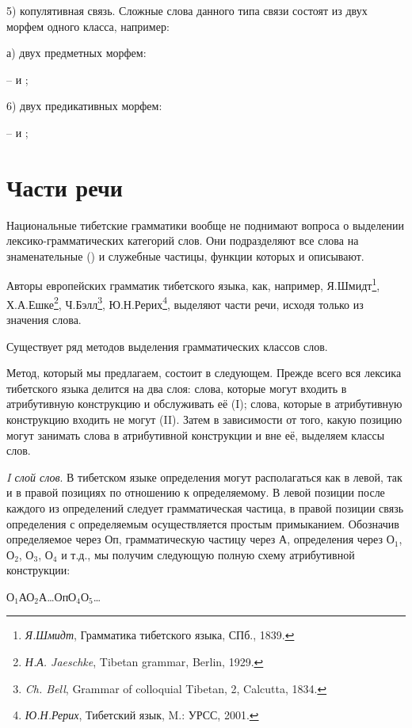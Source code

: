 5) копулятивная связь. Сложные слова данного типа связи состоят из двух морфем одного класса, например:

а) двух предметных морфем:
\begin{prfsample}
    \item {} --  и ; 
\end{prfsample}

6) двух предикативных морфем:
\begin{prfsample}
    \item {} --  и ;
\end{prfsample}

\section{Части речи}

Национальные тибетские грамматики вообще не поднимают вопроса о выделении лексико-грамматических категорий слов. Они подразделяют все слова на знаменательные () и служебные частицы, функции которых и описывают.

Авторы европейских грамматик тибетского языка, как, например,
Я.Шмидт\footnote[20]{\emph{Я.Шмидт}, Грамматика тибетского языка, СПб., 1839.},
Х.А.Ешке\footnote[21]{\emph{Н.А. Jaeschke}, Tibetan grammar, Berlin, 1929.},
Ч.Бэлл\footnote[22]{\emph{Ch. Bell}, Grammar of colloquial Tibetan, 2, Calcutta, 1834.},
Ю.Н.Рерих\footnote[23]{\emph{Ю.Н.Рерих}, Тибетский язык, M.: УРСС, 2001.},
выделяют части речи, исходя только из значения слова.

Существует ряд методов выделения грамматических классов слов.

Метод, который мы предлагаем, состоит в следующем. Прежде всего вся лексика тибетского языка делится на два слоя: слова, которые могут входить в атрибутивную конструкцию и обслуживать её (I); слова, которые в атрибутивную конструкцию входить не могут (II). Затем в зависимости от того, какую позицию могут занимать слова в атрибутивной конструкции и вне её, выделяем классы слов.

\emph{I слой слов}. В тибетском языке определения могут располагаться как в левой, так и в правой позициях по отношению к определяемому. В левой позиции после каждого из определений следует грамматическая частица, в правой позиции связь определения с определяемым осуществляется простым примыканием. Обозначив определяемое через Оп, грамматическую частицу через А, определения через О$_{1}$, О$_{2}$, О$_{3}$, О$_{4}$ и т.д., мы получим следующую полную схему атрибутивной конструкции:
\begin{center}
    О$_{1}$АО$_{2}$А\dots ОпО$_{4}$О$_{5}$\dots
\end{center}

